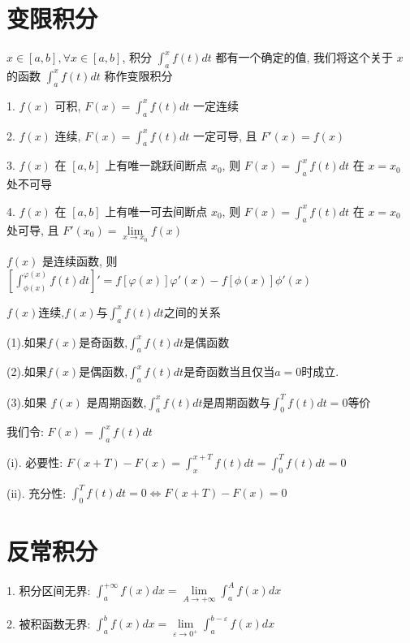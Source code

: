 \section{变限积分}
\begin{definition}[变限积分]
	$x\in[a,b],\forall x\in[a,b]$, 积分 $\int_{a}^{x}f(t)dt$ 都有一个确定的值, 我们将这个关于 $x$ 的函数 $\int_{a}^{x}f(t)dt$ 称作变限积分
\end{definition}
\begin{corollary}[变限积分]
	1. $f(x)$ 可积, $F(x) = \int_{a}^{x}f(t)dt$ 一定连续

	2. $f(x)$ 连续, $F(x) = \int_{a}^{x}f(t)dt$ 一定可导, 且 $F'(x) = f(x)$

	3. $f(x)$ 在 $[a,b]$ 上有唯一跳跃间断点 $x_{0}$, 则 $F(x) = \int_{a}^{x}f(t)dt$ 在 $x=x_{0}$ 处不可导

	4. $f(x)$ 在 $[a,b]$ 上有唯一可去间断点 $x_{0}$, 则 $F(x) = \int_{a}^{x}f(t)dt$ 在 $x=x_{0}$ 处可导, 且 $F'(x_{0}) = \lim\limits_{x\to x_{0}}f(x)$
\end{corollary}
\begin{theorem}[变限积分的导数]
	$f(x)$ 是连续函数, 则 $\left[\int_{\phi(x)}^{\varphi(x)}f(t)dt\right]' = f[\varphi(x)]\varphi'(x) - f[\phi(x)]\phi'(x)$
\end{theorem}
\begin{corollary}[变上限积分奇偶性和周期性与原函数关系]\label{cor: 变上限积分奇偶性和周期性与原函数关系}
	$f(x)$连续,$f(x)$与$\int_{a}^{x} f(t)dt$之间的关系
	
	(1).如果$f(x)$是奇函数,$\int_{a}^{x}f(t)dt$是偶函数
	
	(2).如果$f(x)$是偶函数,$\int_{a}^{x}f(t)dt$是奇函数当且仅当$a=0$时成立.
	
	(3).如果 $f(x)$ 是周期函数,$\int_{a}^{x}f(t)dt\text{是周期函数与}\int_{0}^{T}f(t)dt=0\text{等价}$
	\begin{anymark}[证明]
		我们令: $F(x)=\int_{a}^{x}f(t)dt$

		(i). 必要性: $F(x+T)-F(x)=\int_{x}^{x+T}f(t)dt=\int_{0}^{T}f(t)dt=0$

		(ii). 充分性: $\int_{0}^{T}f(t)dt=0\Leftrightarrow F(x+T)-F(x)=0$
	\end{anymark}
\end{corollary}

\section{反常积分}

\begin{definition}[反常积分]
	1. 积分区间无界: $\int_{a}^{+\infty}f(x)dx = \lim\limits_{A\to +\infty}\int_{a}^{A}f(x)dx$

	2. 被积函数无界: $\int_{a}^{b}f(x)dx = \lim\limits_{\varepsilon\to 0^{+}}\int_{a}^{b-\varepsilon}f(x)dx$
\end{definition}
